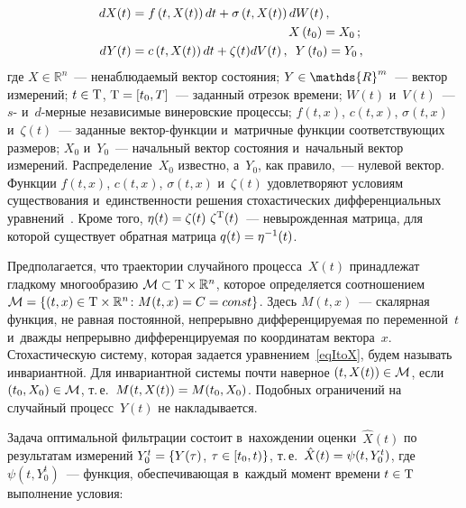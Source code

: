 \begin{multicols}{2}
\vspace*{-2pt}

\noindent
\begin{align}
\label{eqItoX}
\hspace*{-2mm}  dX(t)& = f \left( t,X(t) \right) dt + \sigma \left( t,X(t) \right) dW(t)\,,\notag\\
  &\hspace*{44mm} X\left(t_0\right) = X_0\,;
\\
\label{eqItoY}
\hspace*{-2mm}  dY(t) &= c \left( t,X(t) \right) dt + \zeta(t) dV(t)\,,\enskip Y\left(t_0\right) = Y_0\,,
\end{align}
где $X \in \mathds{R}^n$~--- ненаблюдаемый вектор состояния; 
$Y \hm\in \mathds{R}^m$~--- вектор измерений; $t \hm\in \mathrm{T}$, $\mathrm{T}\hm = 
[t_0,T]$~--- заданный отрезок времени; $W(t)$ и~$V(t)$~--- $s$- 
и~$d$-мер\-ные независимые винеровские процессы; $f(t,x)$, $c(t,x)$,
 $\sigma(t,x)$ и~$\zeta(t)$~--- заданные век\-тор-функ\-ции и~матричные 
 функции соответствующих размеров; $X_0$ и~$Y_0$~--- начальный вектор 
 состояния и~начальный вектор измерений. Распределение~$X_0$ известно, а~$Y_0$, 
 как правило,~--- нулевой вектор. Функции $f(t,x)$, $c(t,x)$, 
 $\sigma(t,x)$ и~$\zeta(t)$ удовлетворяют условиям существования 
 и~единственности решения стохастических дифференциальных уравнений~\cite{OksSul_05}. 
 Кроме того, $\eta(t) = \zeta(t) \  \zeta^{{\mathrm{T}}}(t)$~--- не\-вы\-рож\-ден\-ная мат\-ри\-ца, 
 для которой существует обратная матрица $q(t) \hm= \eta^{-1}(t)$.

Предполагается, что траектории случайного процесса~$X(t)$ 
принадлежат гладкому многообразию $\mathcal{M} \hm\subset \mathrm{T} \times 
\mathbb{R}^n$, которое определяется соотношением $\mathcal{M} \hm= 
\{(t,x) \in \mathrm{T} \times \mathbb{R}^n \colon M(t,x) \hm= C \hm= 
{const}\}$. Здесь $M(t,x)$~--- скалярная функция, не равная 
постоянной, непрерывно дифференцируемая по переменной~$t$ и~дважды 
непрерывно дифференцируемая по координатам вектора~$x$. Стохастическую систему, 
которая задается уравнением~\eqref{eqItoX}, будем называть инвариантной. 
Для инвариантной системы почти наверное $(t,X(t)) \hm\in \mathcal{M}$, если 
$(t_0,X_0)\hm \in \mathcal{M}$, т.\,е.\ $M(t,X(t))\hm = M(t_0,X_0)$. 
Подобных ограничений на случайный процесс~$Y(t)$ не накладывается.

Задача оптимальной фильтрации состоит в~нахождении 
оценки~$\hat X(t)$ по результатам измерений $Y_0^t \hm= \{Y(\tau)$,
$ \tau \hm\in [t_0,t) \}$, т.\,е.\ $\hat X(t)\hm = \psi(t,Y_0^t)$, 
где $\psi(t,Y_0^t)$~--- функция, обеспечивающая в~каждый момент времени $t \hm\in 
\mathrm{T}$ выполнение условия:


\end{multicols}
